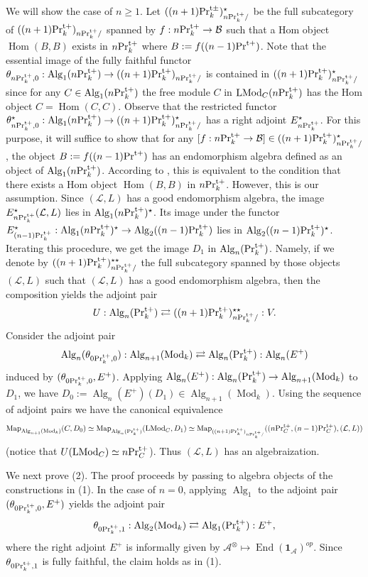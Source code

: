\documentclass[leqno,12pt]{amsart}
\theoremstyle{plain}
\theoremstyle{definition}
\newcommand{\uni}{\mathbf{1}}
\newcommand{\PRTT}{\textup{Pr}^{\textup{t}+}}
\newcommand{\PRTTT}{\textup{Pr}^{\textup{t}\pm}}
\newcommand{\LLL}{\mathcal{L}}
\newcommand{\Hom}{\operatorname{Hom}}
\newcommand{\Mod}{\operatorname{Mod}}
\newcommand{\Map}{\operatorname{Map}}
\newcommand{\Alg}{\operatorname{Alg}}
\newcommand{\End}{\operatorname{End}}
\newcommand{\LMod}{\operatorname{LMod}}
\begin{document}
We will show the case of $n\ge1$.
Let $((n+1)\PRTTT_k)_{n\PRTT_k/}^\star$
be the full subcategory of $((n+1)\PRTT_k)_{n\PRTT_k/}$
spanned by $f:n\PRTT_k\to \mathcal{B}$ such that a Hom object $\Hom(B,B)$ exists in $n\PRTT_k$ 
where $B:=f((n-1)\PRTT)$.
Note that the essential image of the fully faithful functor
$\theta_{n\PRTT_k,0}:\Alg_1(n\PRTT_k)\to ((n+1)\PRTT_k)_{n\PRTT_k/}$
is contained in $((n+1)\PRTT_k)_{n\PRTT_k/}^\star$
since for any $C\in \Alg_1(n\PRTT_k)$ the free module $C$ in $\LMod_C(n\PRTT_k)$ has the Hom object $C=\Hom(C,C)$.
Observe that the restricted functor 
$\theta_{n\PRTT_k,0}^\star:\Alg_1(n\PRTT_k)\to ((n+1)\PRTT_k)^\star_{n\PRTT_k/}$
has a right adjoint $E_{n\PRTT_k}^\star$.
For this purpose, it will suffice to show that for any $[f:n\PRTT_k\to \mathcal{B}]\in ((n+1)\PRTT_k)^\star_{n\PRTT_k/}$, the object $B:=f((n-1)\PRTT)$ has an endomorphism algebra defined as an object of $\Alg_1(n\PRTT_k)$.
According to \cite[4.7.1.40, 4.7.1.41]{HA}, this is equivalent to the condition that there exists a Hom object $\Hom(B,B)$ in $n\PRTT_k$. However, this is our assumption.
Since $(\LLL,L)$ has a good endomorphism algebra,
the image $E_{n\PRTT_k}^\star(\LLL,L)$
lies in $\Alg_1(n\PRTT_k)^{\star}$.
Its image under the functor
$E_{(n-1)\PRTT_k}^\star:\Alg_1(n\PRTT_k)^\star\to \Alg_2((n-1)\PRTT_k)$
lies in $\Alg_2((n-1)\PRTT_k)^\star$.
Iterating this procedure, we get the image $D_1$ in $\Alg_n(\PRTT_k)$.
Namely, if we denote by $((n+1)\PRTT_k)_{n\PRTT_k/}^{\star \star}$ the full subcategory spanned by those objects
$(\LLL,L)$ such that $(\LLL,L)$ has a good endomorphism algebra, then the composition yields the adjoint pair  
\[
U:\Alg_n(\PRTT_k) \rightleftarrows ((n+1)\PRTT_k)_{n\PRTT_k/}^{\star \star}:V.
\]
Consider the adjoint pair
\[
\Alg_{n}(\theta_{0\PRTT_k,0}):\Alg_{n+1}(\Mod_k)\rightleftarrows \Alg_n(\PRTT_k):\Alg_{n}(E^+) 
\]
induced by $(\theta_{0\PRTT_k,0},E^+)$.
Applying
$\Alg_{n}(E^+):\Alg_n(\PRTT_k)\to \Alg_{n+1}(\Mod_k)$
to $D_1$, we have $D_0:=\Alg_{n}(E^+)(D_1) \in\Alg_{n+1}(\Mod_k)$.
Using the sequence of adjoint pairs we have the canonical equivalence
\[
\Map_{\Alg_{n+1}(\Mod_k)}(C,D_0)\simeq \Map_{\Alg_n(\PRTT_k)}(\LMod_C,D_1)\simeq \Map_{ ((n+1)\PRTT_k)_{n\PRTT_k/}}((n\PRTT_{C},(n-1)\PRTT_C),(\LLL,L))
\]
(notice that $U(\LMod_C)\simeq n\PRTT_C$).
Thus $(\LLL,L)$ has an algebraization.



We next prove (2).
The proof proceeds by passing to algebra objects of the constructions in (1).
In the case of $n=0$, applying $\Alg_1$ to the adjoint pair $(\theta_{0\PRTT_k,0}, E^+)$ yields the adjoint pair 
\[
\theta_{0\PRTT_k,1}:\Alg_2(\Mod_k)\rightleftarrows \Alg_1(\PRTT_k):E^+,
\]
where the right adjoint $E^+$ is informally given by $\mathcal{A}^\otimes \mapsto \End(\uni_{\mathcal{A}})^{op}$.
Since $\theta_{0\PRTT_k,1}$ is fully faithful, the claim holds as in (1).
\end{document}
